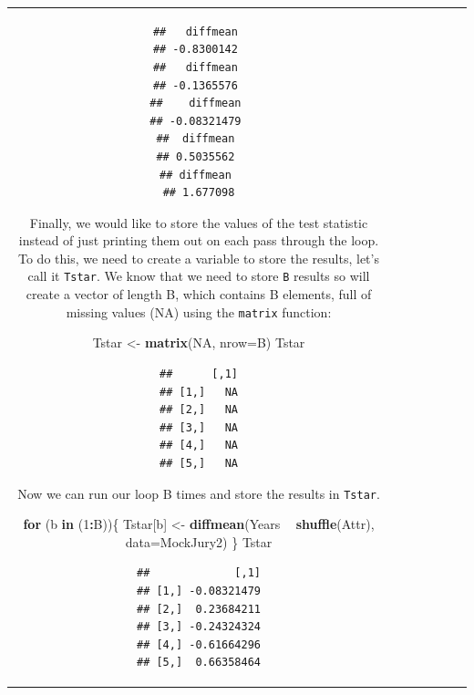 \documentclass[]{book}
\newenvironment{Shaded}{\begin{snugshade}}{\end{snugshade}}
\newcommand{\KeywordTok}[1]{\textcolor[rgb]{0.13,0.29,0.53}{\textbf{#1}}}
\newcommand{\DataTypeTok}[1]{\textcolor[rgb]{0.13,0.29,0.53}{#1}}
\newcommand{\DecValTok}[1]{\textcolor[rgb]{0.00,0.00,0.81}{#1}}
\newcommand{\StringTok}[1]{\textcolor[rgb]{0.31,0.60,0.02}{#1}}
\newcommand{\OtherTok}[1]{\textcolor[rgb]{0.56,0.35,0.01}{#1}}
\newcommand{\ControlFlowTok}[1]{\textcolor[rgb]{0.13,0.29,0.53}{\textbf{#1}}}
\newcommand{\OperatorTok}[1]{\textcolor[rgb]{0.81,0.36,0.00}{\textbf{#1}}}
\newcommand{\NormalTok}[1]{#1}
\theoremstyle{definition}
\theoremstyle{definition}
\theoremstyle{remark}
\begin{document}
\begin{longtable}[]{@{}ccccccc@{}}
\begin{minipage}[b]{0.10\columnwidth}
\begin{verbatim}
##   diffmean 
## -0.8300142 
##   diffmean 
## -0.1365576 
##    diffmean 
## -0.08321479 
##  diffmean 
## 0.5035562 
## diffmean 
## 1.677098
\end{verbatim}

Finally, we would like to store the values of the test statistic instead
of just printing them out on each pass through the loop. To do this, we
need to create a variable to store the results, let's call it
\texttt{Tstar}. We know that we need to store \texttt{B} results so will
create a vector of length B, which contains B elements, full of missing
values (NA) using the \texttt{matrix} function:

\begin{Shaded}
\begin{Highlighting}[]
\NormalTok{Tstar <-}\StringTok{ }\KeywordTok{matrix}\NormalTok{(}\OtherTok{NA}\NormalTok{, }\DataTypeTok{nrow=}\NormalTok{B)}
\NormalTok{Tstar}
\end{Highlighting}
\end{Shaded}

\begin{verbatim}
##      [,1]
## [1,]   NA
## [2,]   NA
## [3,]   NA
## [4,]   NA
## [5,]   NA
\end{verbatim}

Now we can run our loop B times and store the results in \texttt{Tstar}.

\begin{Shaded}
\begin{Highlighting}[]
\ControlFlowTok{for}\NormalTok{ (b }\ControlFlowTok{in}\NormalTok{ (}\DecValTok{1}\OperatorTok{:}\NormalTok{B))\{}
\NormalTok{  Tstar[b] <-}\StringTok{ }\KeywordTok{diffmean}\NormalTok{(Years }\OperatorTok{~}\StringTok{ }\KeywordTok{shuffle}\NormalTok{(Attr), }\DataTypeTok{data=}\NormalTok{MockJury2)}
\NormalTok{\}}
\NormalTok{Tstar}
\end{Highlighting}
\end{Shaded}

\begin{verbatim}
##             [,1]
## [1,] -0.08321479
## [2,]  0.23684211
## [3,] -0.24324324
## [4,] -0.61664296
## [5,]  0.66358464
\end{verbatim}


\end{minipage}
\end{longtable}
\end{document}
